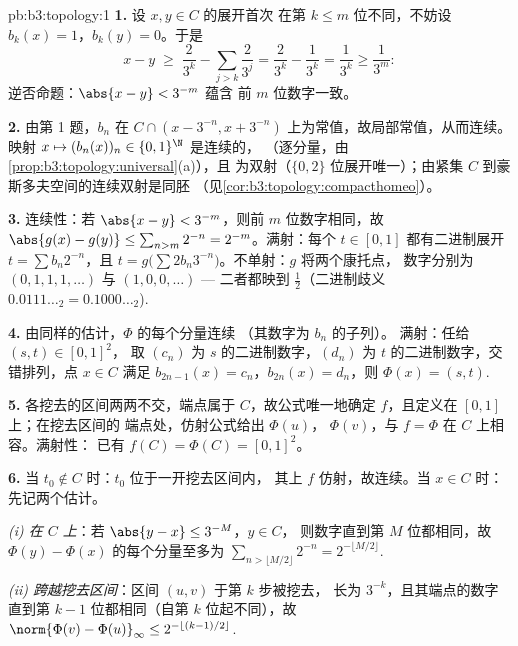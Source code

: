 \begin{solution}{pb:b3:topology:1}
\textbf{1.} 设 $x, y \in C$ 的展开首次
在第 $k \leq m$ 位不同，不妨设 $b_k(x) = 1$，$b_k(y) = 0$。于是
\[
x - y \;\geq\; \frac{2}{3^k} - \sum_{j > k}\frac{2}{3^j}
= \frac{2}{3^k} - \frac{1}{3^k} = \frac1{3^k} \geq \frac1{3^m}:
\]
逆否命题：$\abs{x - y} < 3^{-m}$ 蕴含
前 $m$ 位数字一致。

\textbf{2.} 由第 1 题，$b_n$ 在 $C \cap (x -
3^{-n}, x + 3^{-n})$ 上为常值，故局部常值，从而连续。
映射 $x \mapsto (b_n(x))_n \in \{0,1\}^\N$ 是连续的，
（逐分量，由\cref{prop:b3:topology:universal}(a)），且
为双射（$\{0,2\}$ 位展开唯一）；由紧集
$C$ 到豪斯多夫空间的连续双射是同胚
（见\cref{cor:b3:topology:compacthomeo}）。

\textbf{3.} 连续性：若 $\abs{x - y} < 3^{-m}$，则前
$m$ 位数字相同，故 $\abs{g(x) - g(y)} \leq \sum_{n > m}2^{-n}
= 2^{-m}$。满射：每个 $t \in [0,1]$ 都有二进制展开
$t = \sum b_n2^{-n}$，且 $t = g\bigl(\sum
2b_n3^{-n}\bigr)$。不单射：$g$ 将两个康托点，
数字分别为 $(0,1,1,1,\dots)$ 与 $(1,0,0,\dots)$ ---
二者都映到 $\frac12$（二进制歧义 $0.0111\ldots_2 =
0.1000\ldots_2$).

\textbf{4.} 由同样的估计，$\Phi$ 的每个分量连续
（其数字为 $b_n$ 的子列）。
满射：任给 $(s, t) \in [0,1]^2$，
取 $(c_n)$ 为 $s$ 的二进制数字，$(d_n)$ 为 $t$ 的二进制数字，交错排列，点 $x
\in C$ 满足 $b_{2n-1}(x) = c_n$，$b_{2n}(x) = d_n$，则
$\Phi(x) = (s,t)$.

\textbf{5.} 各挖去的区间两两不交，端点属于
$C$，故公式唯一地确定 $f$，且定义在 $[0,1]$ 上；在挖去区间的
端点处，仿射公式给出 $\Phi(u)$，
$\Phi(v)$，与 $f = \Phi$ 在 $C$ 上相容。满射性：
已有 $f(C) = \Phi(C) = [0,1]^2$。

\textbf{6.} 当 $t_0 \notin C$ 时：$t_0$ 位于一开挖去区间内，
其上 $f$ 仿射，故连续。当 $x \in C$ 时：
先记两个估计。

\emph{(i) 在 $C$ 上}：若 $\abs{y - x} \leq 3^{-M}$，$y \in C$，
则数字直到第 $M$ 位都相同，故 $\Phi(y)
- \Phi(x)$ 的每个分量至多为 $\sum_{n > \lfloor M/2\rfloor} 2^{-n} =
2^{-\lfloor M/2\rfloor}$.

\emph{(ii) 跨越挖去区间}：区间 $(u,v)$ 于第 $k$ 步被挖去，
长为 $3^{-k}$，且其端点的数字
直到第 $k - 1$ 位都相同（自第 $k$ 位起不同），故
$\norm{\Phi(v) - \Phi(u)}_\infty \leq
2^{-\lfloor (k-1)/2\rfloor}$.


\end{solution}

